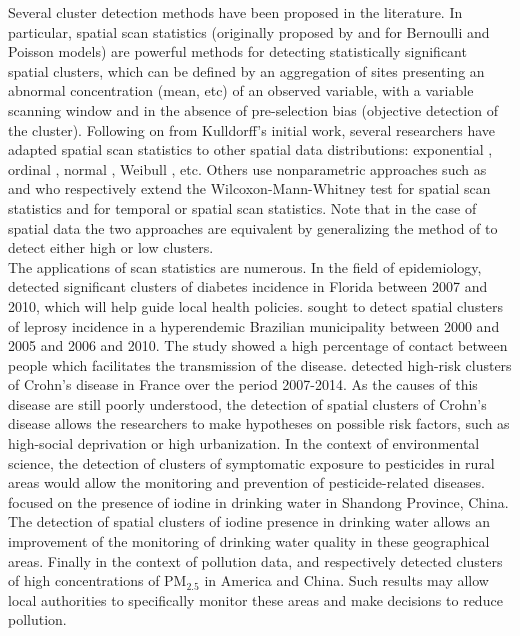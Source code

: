 \noindent Several cluster detection methods have been proposed in the literature. In particular, spatial scan statistics (originally proposed by \citet{spatialdisease} and \citet{spatialscanstat} for Bernoulli and Poisson models) are powerful methods for detecting statistically significant spatial clusters, which can be defined by an aggregation of sites presenting an abnormal concentration (mean, etc) of an observed variable, with a variable scanning window and in the absence of pre-selection bias (objective detection of the cluster). Following on from Kulldorff's initial work, several researchers have adapted spatial scan statistics to other spatial data distributions: exponential \citep{huang2007spatial},
ordinal \citep{jung2007spatial}, normal \citep{normalkulldorff}, Weibull \citep{bhatt2014spatial}, etc. Others use nonparametric approaches such as \citet{A_nonparametric_spatial} and \citet{cucala2016mann} who respectively extend the Wilcoxon-Mann-Whitney test for spatial scan statistics and for temporal or spatial scan statistics. Note that in the case of spatial data the two approaches are equivalent by generalizing the method of \citet{A_nonparametric_spatial} to detect either high or low clusters. \\

\noindent The applications of scan statistics are numerous. In the field of epidemiology, \citet{khan2021geographic} detected significant clusters of diabetes incidence in Florida between 2007 and 2010, which will help guide local health policies. \citet{marciano2018epidemiological} sought to detect spatial clusters of leprosy incidence in a hyperendemic Brazilian municipality between 2000 and 2005 and 2006 and 2010. The study showed a high percentage of contact between people which facilitates the transmission of the disease. %
\citet{genin2020fine} detected high-risk clusters of Crohn's disease in France over the period 2007-2014. As the causes of this disease are still poorly understood, the detection of spatial clusters of Crohn's disease allows the researchers to make hypotheses on possible risk factors, such as high-social deprivation or high urbanization.
In the context of environmental science, the detection of clusters of symptomatic exposure to pesticides in rural areas \citep{sudakin2002regional} would allow the monitoring and prevention of pesticide-related diseases. \citet{geology} focused on the presence of iodine in drinking water in Shandong Province, China. The detection of spatial clusters of iodine presence in drinking water allows an improvement of the monitoring of drinking water quality in these geographical areas. Finally in the context of pollution data, \cite{wan2020industrial} and \cite{shi2021spatial} respectively detected clusters of high concentrations of $\text{PM}_{2.5}$ in America and China. Such results may allow local authorities to specifically monitor these areas and make decisions to reduce pollution. \\

